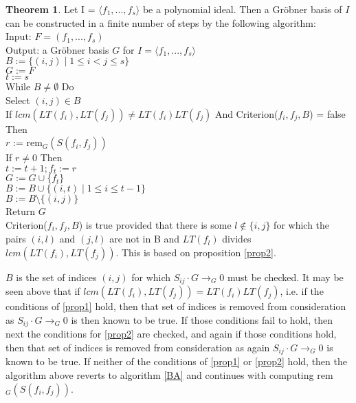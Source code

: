 \documentclass[reqno]{amsart}
\theoremstyle{definition}
\newtheorem{thm}[lem]{Theorem}
\theoremstyle{definition}
\begin{document}
\newpage
\begin{thm}
Let I = $\langle f_1, ..., f_s\rangle$ be a polynomial ideal. Then a Gr{\"o}bner basis of $I$ can be constructed in a finite number of steps by the following algorithm: 
\\Input: $F = (f_1, ..., f_s)$
\\Output: a Gr{\"o}bner basis $G$ for $I = \langle f_1, ..., f_s\rangle$
\vspace{2mm}
\\$B := \{(i,j)\mid 1\leq i < j\leq s\}$
\\$G:= F$
\\$t := s$
\\While $B\neq \emptyset$ Do
\\\hspace*{10mm} Select $(i,j)\in B$
\\\hspace*{10mm} If $lcm(LT(f_i),LT(f_j)) \neq LT(f_i)LT(f_j)$ And Criterion($f_i,f_j,B$) = false Then
\\\hspace*{15mm} $r$ := rem$_G(S(f_i,f_j))$
\\\hspace*{15mm} If $r\neq 0$ Then 
\\\hspace*{21mm} $t := t+1; f_t := r$
\\\hspace*{20mm} $G := G \cup \{f_t \}$
\\\hspace*{20mm} $B := B \cup \{(i,t)\mid1\leq i \leq t-1\}$
\\\hspace*{10mm} $B := B\setminus \{(i,j)\}$
\\Return $G$
\vspace*{2mm}
\\Criterion($f_i,f_j,B$) is true provided that there is some $l\notin \{i,j\}$ for which the pairs $(i,l)$ and $(j,l)$ are not in B and $LT(f_l)$ divides $lcm(LT(f_i),LT(f_j))$. This is based on proposition \ref{prop2}.

\end{thm}

$B$ is the set of indices $(i,j)$ for which $S_{ij}\cdot G\rightarrow_G 0$ must be checked. It may be seen above that if $lcm(LT(f_i),LT(f_j)) = LT(f_i)LT(f_j)$, i.e. if the conditions of \ref{prop1} hold, then that set of indices is removed from consideration as $S_{ij}\cdot G\rightarrow_G 0$ is then known to be true. If those conditions fail to hold, then next the conditions for \ref{prop2} are checked, and again if those conditions hold, then that set of indices is removed from consideration as again $S_{ij}\cdot G\rightarrow_G 0$ is known to be true. If neither of the conditions of \ref{prop1} or \ref{prop2} hold, then the algorithm above reverts to algorithm \ref{BA} and continues with computing rem$_G(S(f_i,f_j))$.







\end{document}
